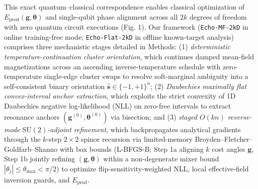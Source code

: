 \documentclass[10pt,a4paper]{article}
\begin{document}
This exact quantum--classical correspondence enables classical optimization of $E_{\mathrm{prod}}(\boldsymbol{g}, \boldsymbol{\theta})$ and single-qubit phase alignment across all $2k$ degrees of freedom with zero quantum circuit executions (Fig. 1). Our framework (\texttt{Echo-MF-2kD} in online training-free mode; \texttt{Echo-Flat-2kD} in offline known-target analysis) comprises three mechanistic stages detailed in Methods: (1) \emph{deterministic temperature-continuation cluster orientation}, which continues damped mean-field magnetizations across an ascending inverse-temperature schedule with zero-temperature single-edge cluster swaps to resolve soft-marginal ambiguity into a self-consistent binary orientation $\hat{\boldsymbol{s}} \in \{-1, +1\}^n$; (2) \emph{Daubechies maximally flat convex-interval anchor extraction}, which exploits the strict convexity of 1D Daubechies negative log-likelihood (NLL) on zero-free intervals to extract resonance anchors $(\boldsymbol{g}^{(0)}, \boldsymbol{\theta}^{(0)})$ via bisection; and (3) \emph{staged $O(kn)$ reverse-mode $\mathrm{SU}(2)$-adjoint refinement}, which backpropagates analytical gradients through the $k$-step $2\times 2$ spinor recursion via limited-memory Broyden--Fletcher--Goldfarb--Shanno with box bounds (L-BFGS-B; Step 1a aligning $k$ cost angles $\boldsymbol{g}$, Step 1b jointly refining $(\boldsymbol{g}, \boldsymbol{\theta})$ within a non-degenerate mixer bound $|\theta_j| \le \theta_{\max} < \pi/2$) to optimize flip-sensitivity-weighted NLL, local effective-field inversion guards, and $E_{\mathrm{prod}}$.
\end{document}
